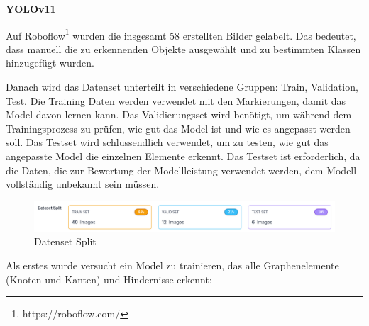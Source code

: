 \textbf{YOLOv11}

Auf Roboflow\footnote{https://roboflow.com/} wurden die insgesamt 58 erstellten Bilder gelabelt.
Das bedeutet, dass manuell die zu erkennenden Objekte ausgewählt und zu bestimmten Klassen hinzugefügt wurden.

Danach wird das Datenset unterteilt in verschiedene Gruppen: Train, Validation, Test. Die Training Daten werden verwendet mit den Markierungen, damit das Model davon lernen kann. Das Validierungsset wird benötigt, um während dem Trainingsprozess zu prüfen, wie gut das Model ist und wie es angepasst werden soll. Das Testset wird schlussendlich verwendet, um zu testen, wie gut das angepasste Model die einzelnen Elemente erkennt. Das Testset ist erforderlich, da die Daten, die zur Bewertung der Modellleistung verwendet werden, dem Modell vollständig unbekannt sein müssen.
\begin{figure}[H]
    \centering
    \includegraphics[width=\linewidth]{assets/informatik-prototyp/yolo/dataset-split.png}
    \caption{Datenset Split}
    \label{fig:data-split}
\end{figure}

Als erstes wurde versucht ein Model zu trainieren, das alle Graphenelemente (Knoten und Kanten) und Hindernisse erkennt:

